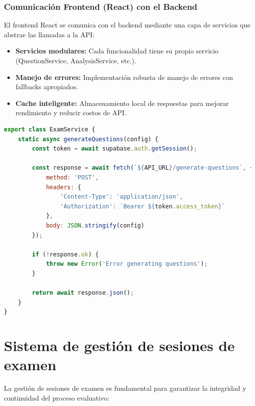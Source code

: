 \documentclass[12pt,a4paper]{report}
\begin{document}
\subsubsection{Comunicación Frontend (React) con el Backend}

El frontend React se comunica con el backend mediante una capa de servicios que abstrae las llamadas a la API:

\begin{itemize}
\item \textbf{Servicios modulares:} Cada funcionalidad tiene su propio servicio (QuestionService, AnalysisService, etc.).

\item \textbf{Manejo de errores:} Implementación robusta de manejo de errores con fallbacks apropiados.

\item \textbf{Cache inteligente:} Almacenamiento local de respuestas para mejorar rendimiento y reducir costos de API.
\end{itemize}

\begin{lstlisting}[language=JavaScript, caption=Servicio de comunicación en React]
export class ExamService {
    static async generateQuestions(config) {
        const token = await supabase.auth.getSession();
        
        const response = await fetch(`${API_URL}/generate-questions`, {
            method: 'POST',
            headers: {
                'Content-Type': 'application/json',
                'Authorization': `Bearer ${token.access_token}`
            },
            body: JSON.stringify(config)
        });
        
        if (!response.ok) {
            throw new Error('Error generating questions');
        }
        
        return await response.json();
    }
}
\end{lstlisting}

\section{Sistema de gestión de sesiones de examen}

La gestión de sesiones de examen es fundamental para garantizar la integridad y continuidad del proceso evaluativo:
\end{document}
